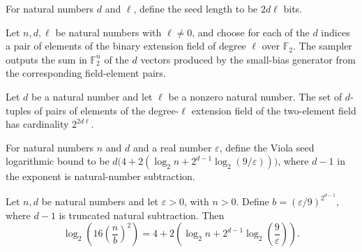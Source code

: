 \begin{definition}
\label{FABL.violaSmallBiasSeedBits}
\leanok
For natural numbers $d$ and $\ell$, define the seed length to be $2d\ell$ bits.
\end{definition}

\begin{definition}
\label{FABL.violaSmallBiasSampler}
\leanok
{}
Let $n,d,\ell$ be natural numbers with $\ell\ne 0$, and choose for each of the $d$
indices a pair of elements of the binary extension field of degree $\ell$ over $\mathbb
F_2$. The sampler outputs the sum in $\mathbb F_2^n$ of the $d$ vectors produced by the
small-bias generator from the corresponding field-element pairs.
\end{definition}

\begin{theorem}
\label{FABL.card_violaSmallBiasSamplerSeedSpace}
\leanok
{}
Let $d$ be a natural number and let $\ell$ be a nonzero natural number. The set of
$d$-tuples of pairs of elements of the degree-$\ell$ extension field of the two-element
field has cardinality $2^{2d\ell}$.
\end{theorem}

\begin{definition}
\label{FABL.violaSeedLogBound}
\leanok
For natural numbers $n$ and $d$ and a real number $\varepsilon$, define the Viola seed
logarithmic bound to be $d\bigl(4+2(\log_2 n+2^{d-1}\log_2(9/\varepsilon))\bigr)$, where
$d-1$ in the exponent is natural-number subtraction.
\end{definition}

\begin{theorem}
\label{FABL.logb_smallBiasSupportEnvelope_eq}
\leanok
{}
Let $n,d$ be natural numbers and let $\varepsilon>0$, with $n>0$. Define
$b=(\varepsilon/9)^{2^{d-1}}$, where $d-1$ is truncated natural subtraction. Then
\[\log_2\!\left(16\left(\frac{n}{b}\right)^2\right)=4+2\left(\log_2 n+2^{d-1}\log_2\!\left(\frac{9}{\varepsilon}\right)\right).\]
\end{theorem}

